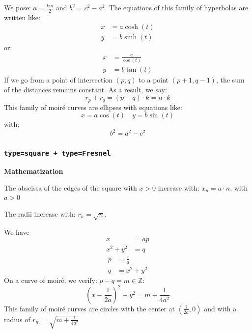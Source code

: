 \documentclass[%
    11pt,
    english,
    BCOR10mm,
    DIV12,
    bibliography=totoc,
    parskip=false,
    fleqn,
    smallheadings,
    headexclude,
    footexclude,
    oneside,
    dvipsnames,
    svgnames,
    x11names
]{pst-doc}
\begin{document}
{{{We pose: $a=\frac{km}{2}$ and $b^2=c^2-a^2$. The equations of this family of hyperbolas are written like:
\begin{align*}
x&=a\cosh(t)\\
y&=b\sinh(t)
\end{align*}
or:
\begin{align*}
x&=\frac{a}{\cos(t)}\\
y&=b\tan(t)
\end{align*}
If we go from a point of intersection $(p,q)$ to a point $(p+1,q-1)$, the sum of the distances remains constant. As a result, we say:
\begin{equation*}
r_p+r_q=(p+q)\cdot k=n\cdot k
\end{equation*}
This family of moiré curves are ellipses with equations like:
\begin{equation*}
x=a\cos(t)\quad y=b\sin(t)
\end{equation*}
with:
\[
b^2=a^2-c^2
\]


\subsubsection{\texttt{type=square + type=Fresnel}}

\begin{center}
\hfill
{}
\end{center}

\textbf{Mathematization}

The abscissa of the edges of the square with $x>0$ increase with: $x_n=a\cdot n$, with $a>0$

The radii increase with: $r_n=\sqrt{n}$.

We have
\begin{align*}
x&=ap\\
x^2+y^2&=q
\end{align*}
\begin{align*}
p&=\frac{x}{a}\\
q&=x^2+y^2
\end{align*}
On a curve of moiré, we verify: $p-q=m\in\mathbb{Z}$:
\begin{equation*}
\left(x-\frac{1}{2a}\right)^2+y^2=m+\frac{1}{4a^2}
\end{equation*}
This family of moiré curves are circles with the center at $(\frac{1}{2a},0)$ and with a radius of $r_m=\sqrt{m+\frac{1}{4a^2}}$


}}}
\end{document}
